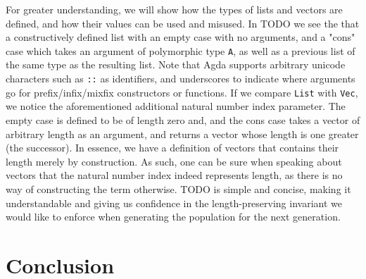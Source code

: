 \documentclass{acm_proc_article-sp}
\begin{document}
For greater understanding, we will show how the types of lists and
vectors are defined, and how their values can be used and misused. In
TODO we see the that a constructively defined list with an empty case
with no arguments, and a "cons" case which takes an argument of
polymorphic type \texttt{A}, as well as a previous list of the same
type as the resulting list. Note that Agda supports arbitrary unicode
characters such as \texttt{::} as identifiers, and underscores to
indicate where arguments go for prefix/infix/mixfix constructors or
functions. If we compare \texttt{List} with \texttt{Vec}, we notice
the aforementioned additional natural number index parameter. The
empty case is defined to be of length zero and, and the cons case
takes a vector of arbitrary length as an argument, and returns a
vector whose length is one greater (the successor). In essence, we
have a definition of vectors that contains their length merely by
construction. As such, one can be sure when speaking about vectors
that the natural number index indeed represents length, as there is no
way of constructing the term otherwise. TODO is simple and concise,
making it understandable and giving us confidence in the
length-preserving invariant we would like to enforce when generating
the population for the next generation.


\section{Conclusion}




\end{document}
